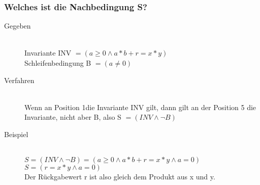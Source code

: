 \documentclass[a4paper,10pt]{article}
\begin{document}
\subsubsection{Welches ist die Nachbedingung S?}
\begin{description}
	\item[Gegeben] \hfill \\
		Invariante INV $= (a \geq 0 \wedge a*b + r = x*y)$ \\
		Schleifenbedingung B $= (a \neq 0)$
	\item[Verfahren] \hfill \\
		Wenn an Position 1die Invariante INV gilt, dann gilt an der Position 5 die Invariante, nicht aber B, also S $= (INV \wedge \neg B)$
	\item[Beispiel] \hfill \\
		$S = (INV \wedge \neg B) = (a \geq 0 \wedge a*b + r = x*y \wedge a = 0)$ \\
		$S = (r = x*y \wedge a = 0)$ \\
		Der R\"uckgabewert r ist also gleich dem Produkt aus x und y.
\end{description}
\end{document}

